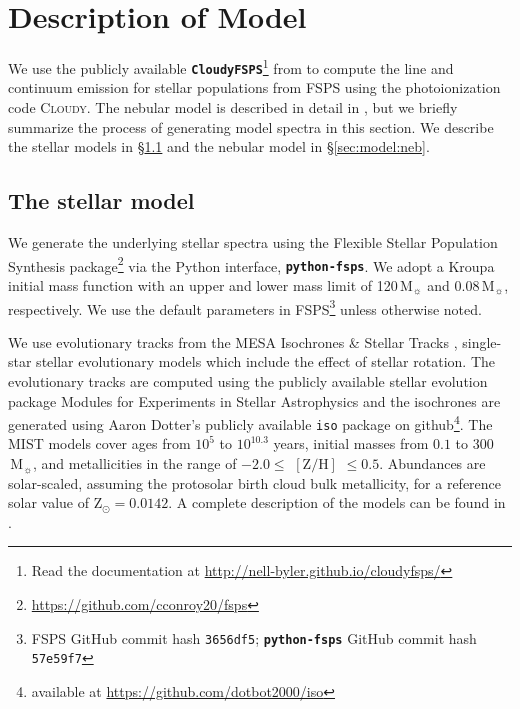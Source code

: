 \documentclass[preprint2]{aastex62}
\newcommand{\FSPS}{{\sc FSPS}\xspace}
\newcommand{\pFSPS}{{\tt \textbf{python-fsps}}\xspace}
\newcommand{\CloudyFSPS}{{\tt \textbf{CloudyFSPS}}\xspace}
\newcommand{\Cloudy}{\textsc{Cloudy}\xspace}
\newcommand\Msun{\ensuremath{\,\mathrm{M_{\sun}}}\xspace}
\begin{document}
\section{Description of Model}\label{sec:model}

We use the publicly available \CloudyFSPS\footnote{Read the documentation at \url{http://nell-byler.github.io/cloudyfsps/}} \citep{cloudyFSPSv1} from \citet{Byler+2017} to compute the line and continuum emission for stellar populations from \FSPS using the photoionization code \Cloudy. The nebular model is described in detail in \citet{Byler+2017}, but we briefly summarize the process of generating model spectra in this section. We describe the stellar models in \S\ref{sec:model:stellar} and the nebular model in \S\ref{sec:model:neb}.

\subsection{The stellar model}\label{sec:model:stellar}

We generate the underlying stellar spectra using the Flexible Stellar Population Synthesis package\footnote{\url{https://github.com/cconroy20/fsps}} \citep[FSPS; ][]{Conroy+2009, Conroy+2010} via the Python interface, \pFSPS \citep{pythonFSPSdfm}. We adopt a Kroupa initial mass function \citep[IMF;][]{Kroupa+2001} with an upper and lower mass limit of 120\Msun and 0.08\Msun, respectively. We use the default parameters in \FSPS\footnote{\FSPS GitHub commit hash \texttt{3656df5}; \pFSPS GitHub commit hash \texttt{57e59f7}} unless otherwise noted.

We use evolutionary tracks from the MESA Isochrones \& Stellar Tracks \citep[MIST\footnote{Documentation, packaged model grids, and a web interpolator are available at \url{http://waps.cfa.harvard.edu/MIST/}};][]{Dotter+2016, Choi+2016}, single-star stellar evolutionary models which include the effect of stellar rotation. The evolutionary tracks are computed using the publicly available stellar evolution package Modules for Experiments in Stellar Astrophysics \citep[MESA v7503;][]{Paxton+2011,Paxton+2013, Paxton+2015} and the isochrones are generated using Aaron Dotter's publicly available \texttt{iso} package on github\footnote{available at \url{https://github.com/dotbot2000/iso}}. The MIST models cover ages from $10^5$ to $10^{10.3}$ years, initial masses from $0.1$ to $300\,$\Msun, and metallicities in the range of $-2.0 \leq$ $[\mathrm{Z}/\mathrm{H}]$ $\leq 0.5$. Abundances are solar-scaled, assuming the \citet{Asplund+2009} protosolar birth cloud bulk metallicity, for a reference solar value of $\mathrm{Z}_{\odot} = 0.0142$.  A complete description of the models can be found in \citet{Choi+2016}.
\end{document}
